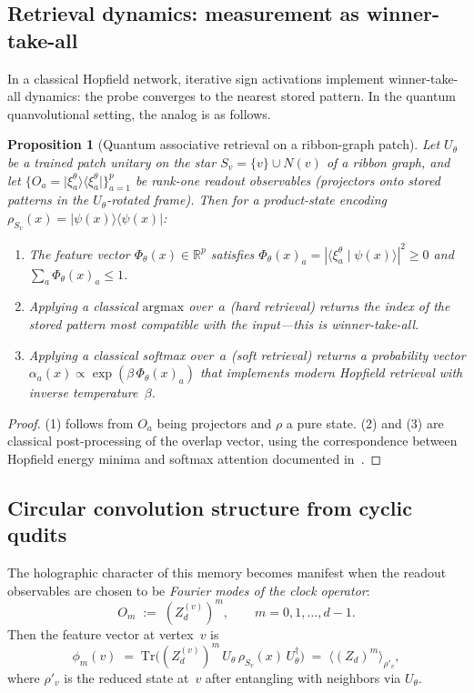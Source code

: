 \documentclass[11pt,oneside]{amsbook}
\numberwithin{equation}{section}
\theoremstyle{plain}
\newtheorem{proposition}[theorem]{Proposition}
\theoremstyle{definition}
\theoremstyle{remark}
\newcommand{\braket}[2]{\langle #1 \mid #2 \rangle}
\newcommand{\ketbra}[2]{\lvert #1 \rangle\!\langle #2 \rvert}
\begin{document}
\subsection{Retrieval dynamics: measurement as winner-take-all}

In a classical Hopfield network, iterative sign activations implement winner-take-all dynamics:
the probe converges to the nearest stored pattern.
In the quantum quanvolutional setting, the analog is as follows.

\begin{proposition}[Quantum associative retrieval on a ribbon-graph patch]
\label{prop:quantum_assoc_retrieval}
Let $U_\theta$ be a trained patch unitary on the star $S_v=\{v\}\cup N(v)$ of a ribbon graph,
and let $\{O_a=\ketbra{\xi_a^\theta}{\xi_a^\theta}\}_{a=1}^p$ be rank-one readout observables
(projectors onto stored patterns in the $U_\theta$-rotated frame).
Then for a product-state encoding $\rho_{S_v}(x)=\ketbra{\psi(x)}{\psi(x)}$:
\begin{enumerate}
\item The feature vector $\Phi_\theta(x)\in\mathbb{R}^p$ satisfies $\Phi_\theta(x)_a=|\braket{\xi_a^\theta}{\psi(x)}|^2\ge 0$
and $\sum_a \Phi_\theta(x)_a\le 1$.
\item Applying a classical $\mathrm{argmax}$ over~$a$ (hard retrieval) returns the index of the
stored pattern most compatible with the input---this is winner-take-all.
\item Applying a classical softmax over~$a$ (soft retrieval) returns a probability vector
$\alpha_a(x)\propto \exp(\beta\,\Phi_\theta(x)_a)$ that implements modern Hopfield retrieval
with inverse temperature~$\beta$.
\end{enumerate}
\end{proposition}

\begin{proof}
(1) follows from $O_a$ being projectors and $\rho$ a pure state.
(2) and (3) are classical post-processing of the overlap vector, using the correspondence
between Hopfield energy minima and softmax attention documented in~\cite{Ramsauer2020HopfieldAllYouNeed}.
\end{proof}

\subsection{Circular convolution structure from cyclic qudits}
\label{subsec:circ_conv_qudits}

The holographic character of this memory becomes manifest when the readout observables are
chosen to be \emph{Fourier modes of the clock operator}:
\[
  O_m \;:=\; (Z_d^{(v)})^m,\qquad m=0,1,\ldots,d-1.
\]
Then the feature vector at vertex~$v$ is
\begin{equation}
  \phi_m(v)
  \;=\;
  \mathrm{Tr}\bigl((Z_d^{(v)})^m\, U_\theta\,\rho_{S_v}(x)\,U_\theta^\dagger\bigr)
  \;=\;
  \langle (Z_d)^m\rangle_{\rho'_v},
  \label{eq:fourier_features}
\end{equation}
where $\rho'_v$ is the reduced state at~$v$ after entangling with neighbors via $U_\theta$.
\end{document}
